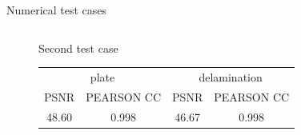 \documentclass[10pt,aspectratio=169,dvipsnames]{beamer} %
\begin{document}
\begin{frame}{Numerical test cases}
\begin{columns}[T]
\begin{column}[c]{0.5\textwidth}
\begin{figure}
{\begin{alertblock}{Second test case}
						\begin{table}[!h]
							\centering 
							\footnotesize	
							\begin{tabular}{cccc}
								\toprule
								\multicolumn{2}{c}{plate} & \multicolumn{2}{c}{delamination} \\
								\cmidrule(lr){1-2} \cmidrule(lr){3-4}
								PSNR & PEARSON CC & PSNR & PEARSON CC \\ 
								\midrule
								48.60 & 0.998 & 46.67 & 0.998 \\					
								\bottomrule
							\end{tabular}
						\end{table}
				\end{alertblock}}
			\end{figure}
		\end{column}
		\begin{column}[c]{0.5\textwidth}
\end{column}
\end{columns}
\end{frame}
\end{document}
